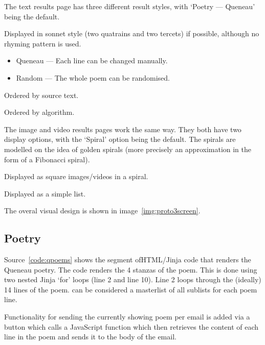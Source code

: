 The text results page has three different result styles, with `Poetry --- Queneau' being the default.

\begin{description}[leftmargin=2.8cm]
  \item [Poetry] Displayed in sonnet style (two quatrains and two tercets) if possible, although no rhyming pattern is used.
    \begin{itemize}
      \item Queneau --- Each line can be changed manually.
      \item Random --- The whole poem can be randomised.
    \end{itemize}
  \item [Sources] Ordered by source text.
  \item [Algorithms] Ordered by algorithm.
\end{description}

The image and video results pages work the same way. They both have two display options, with the `Spiral' option being the default. The spirals are modelled on the idea of golden spirals (more precisely an approximation in the form of a Fibonacci spiral).

\begin{description}[leftmargin=1.8cm]
  \item [Spiral] Displayed as square images/videos in a spiral.
  \item [List] Displayed as a simple list.
\end{description}

The overal visual design is shown in image~\ref{img:proto3screen}.


\subsection{Poetry}
\label{s:poetry}

Source~\ref{code:qpoems} shows the segment of\ac{HTML}/Jinja code that renders the Queneau poetry. The code renders the 4 stanzas of the poem. This is done using two nested Jinja `for' loops (line 2 and line 10). Line 2 loops through the (ideally) 14 lines of the poem.  can be considered a masterlist of all sublists for each poem line.

Functionality for sending the currently showing poem per email is added via a button which calls a JavaScript function  which then retrieves the content of each line in the poem and sends it to the body of the email. 

